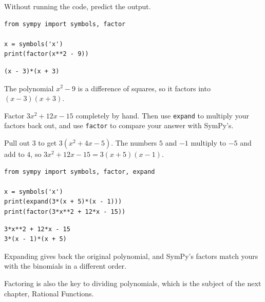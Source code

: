 \begin{Exercise}[title={Predict what SymPy prints}, label={ex:factoring_polynomials-python-5}]
Without running the code, predict the output.
\begin{verbatim}
from sympy import symbols, factor

x = symbols('x')
print(factor(x**2 - 9))
\end{verbatim}
\end{Exercise}
\begin{Answer}[ref={ex:factoring_polynomials-python-5}]
\begin{verbatim}
(x - 3)*(x + 3)
\end{verbatim}
The polynomial $x^2 - 9$ is a difference of squares, so it factors into
$(x - 3)(x + 3)$.
\end{Answer}

\begin{Exercise}[title={Factor by hand, then check with SymPy}, label={ex:factoring_polynomials-python-6}]
Factor $3x^2 + 12x - 15$ completely by hand. Then use
\texttt{expand} to multiply your factors back out, and use
\texttt{factor} to compare your answer with SymPy's.
\end{Exercise}
\begin{Answer}[ref={ex:factoring_polynomials-python-6}]
Pull out 3 to get $3(x^2 + 4x - 5)$. The numbers $5$ and $-1$ multiply
to $-5$ and add to $4$, so $3x^2 + 12x - 15 = 3(x + 5)(x - 1)$.
\begin{verbatim}
from sympy import symbols, factor, expand

x = symbols('x')
print(expand(3*(x + 5)*(x - 1)))
print(factor(3*x**2 + 12*x - 15))
\end{verbatim}
\begin{verbatim}
3*x**2 + 12*x - 15
3*(x - 1)*(x + 5)
\end{verbatim}
Expanding gives back the original polynomial, and SymPy's factors match
yours with the binomials in a different order.
\end{Answer}


Factoring is also the key to dividing polynomials, which is the subject of the next chapter, Rational
Functions.
